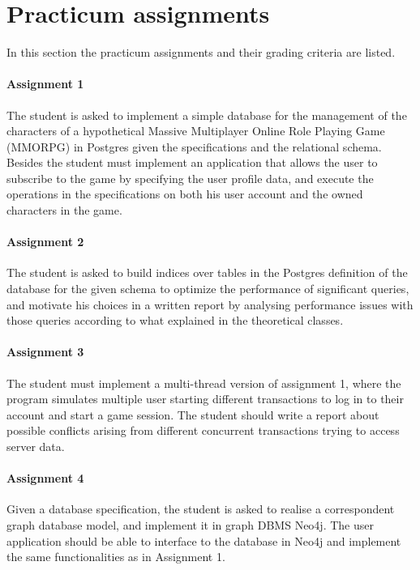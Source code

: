 \section{Practicum assignments}
	In this section the practicum assignments and their grading criteria are listed.
	
	\paragraph{Assignment 1}
		The student is asked to implement a simple database for the management of the characters of a hypothetical Massive Multiplayer Online Role Playing Game (MMORPG) in Postgres given the specifications and the relational schema. Besides the student must implement an application that allows the user to subscribe to the game by specifying the user profile data, and execute the operations in the specifications on both his user account and the owned characters in the game.

	\paragraph{Assignment 2}
		The student is asked to build indices over tables in the Postgres definition of the database for the given schema to optimize the performance of significant queries, and motivate his choices in a written report by analysing performance issues with those queries according to what explained in the theoretical classes.

	\paragraph{Assignment 3}
		The student must implement a multi-thread version of assignment 1, where the program simulates multiple user starting different transactions to log in to their account and start a game session. The student should write a report about possible conflicts arising from different concurrent transactions trying to access server data.

	\paragraph{Assignment 4}
		Given a database specification, the student is asked to realise a correspondent graph database model, and implement it in graph DBMS Neo4j. The user application should be able to interface to the database in Neo4j and implement the same functionalities as in Assignment 1.
